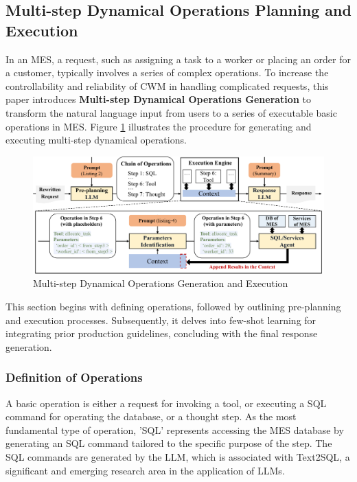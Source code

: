 \documentclass[preprint,12pt]{elsarticle}
\begin{document}
\subsection{Multi-step Dynamical Operations Planning and Execution}
In an MES, a request, such as assigning a task to a worker or placing an order for a customer, typically involves a series of complex operations.
To increase the controllability and reliability of CWM in handling complicated requests, this paper introduces \textbf{Multi-step Dynamical Operations Generation} to transform the natural language input from users to a series of executable basic operations in MES.
Figure \ref{fig:tech_multi_step} illustrates the procedure for generating and executing multi-step dynamical operations.
\begin{figure}
    \centering
    \includegraphics[width=\linewidth]{figs/multi_step.pdf}
    \caption{Multi-step Dynamical Operations Generation and Execution}
    \label{fig:tech_multi_step}
\end{figure}
This section begins with defining operations, followed by outlining pre-planning and execution processes. Subsequently, it delves into few-shot learning for integrating prior production guidelines, concluding with the final response generation.

\subsubsection{Definition of Operations}
A basic operation is either a request for invoking a tool, or executing a SQL command for operating the database, or a thought step.
As the most fundamental type of operation, 'SQL' represents accessing the MES database by generating an SQL command tailored to the specific purpose of the step.
The SQL commands are generated by the LLM, which is associated with Text2SQL, a significant and emerging research area in the application of LLMs.
\end{document}
